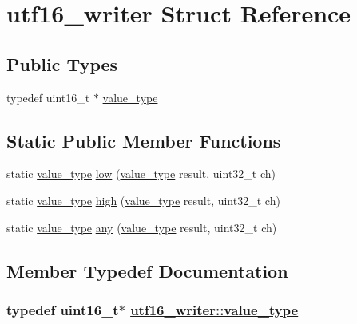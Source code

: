 \hypertarget{structutf16__writer}{
\section{utf16\_\-writer Struct Reference}
\label{structutf16__writer}
}
\subsection*{Public Types}
\begin{CompactItemize}
\item 
typedef uint16\_\-t $\ast$ \hyperlink{structutf16__writer_527b705eaf5099167b8bc42423ce918c}{value\_\-type}
\end{CompactItemize}
\subsection*{Static Public Member Functions}
\begin{CompactItemize}
\item 
static \hyperlink{structutf16__writer_527b705eaf5099167b8bc42423ce918c}{value\_\-type} \hyperlink{structutf16__writer_b11fef721a8b38de5e315d2e75d12956}{low} (\hyperlink{structutf16__writer_527b705eaf5099167b8bc42423ce918c}{value\_\-type} result, uint32\_\-t ch)
\item 
static \hyperlink{structutf16__writer_527b705eaf5099167b8bc42423ce918c}{value\_\-type} \hyperlink{structutf16__writer_01b6ce1a567dea11daead3ca83f42d5c}{high} (\hyperlink{structutf16__writer_527b705eaf5099167b8bc42423ce918c}{value\_\-type} result, uint32\_\-t ch)
\item 
static \hyperlink{structutf16__writer_527b705eaf5099167b8bc42423ce918c}{value\_\-type} \hyperlink{structutf16__writer_c14e06db126fbbef4be7efdb80fbdf4a}{any} (\hyperlink{structutf16__writer_527b705eaf5099167b8bc42423ce918c}{value\_\-type} result, uint32\_\-t ch)
\end{CompactItemize}


\subsection{Member Typedef Documentation}
\hypertarget{structutf16__writer_527b705eaf5099167b8bc42423ce918c}{
\subsubsection[value\_\-type]{\setlength{\rightskip}{0pt plus 5cm}typedef uint16\_\-t$\ast$ \hyperlink{structutf16__writer_527b705eaf5099167b8bc42423ce918c}{utf16\_\-writer::value\_\-type}}}
\label{structutf16__writer_527b705eaf5099167b8bc42423ce918c}




